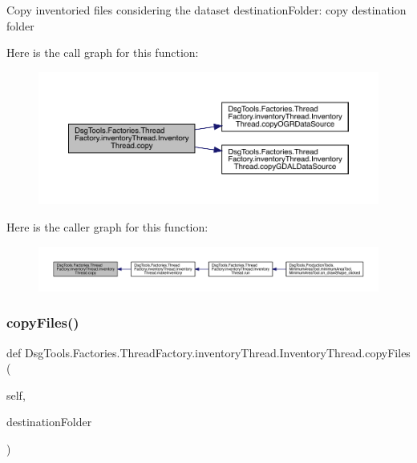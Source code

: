 \begin{DoxyVerb}Copy inventoried files considering the dataset
destinationFolder: copy destination folder
\end{DoxyVerb}
 Here is the call graph for this function\+:
\nopagebreak
\begin{figure}[H]
\begin{center}
\leavevmode
\includegraphics[width=350pt]{class_dsg_tools_1_1_factories_1_1_thread_factory_1_1inventory_thread_1_1_inventory_thread_a1dd2d109fee4f8015236e57b54caea5a_cgraph}
\end{center}
\end{figure}
Here is the caller graph for this function\+:
\nopagebreak
\begin{figure}[H]
\begin{center}
\leavevmode
\includegraphics[width=350pt]{class_dsg_tools_1_1_factories_1_1_thread_factory_1_1inventory_thread_1_1_inventory_thread_a1dd2d109fee4f8015236e57b54caea5a_icgraph}
\end{center}
\end{figure}
\mbox{\label{class_dsg_tools_1_1_factories_1_1_thread_factory_1_1inventory_thread_1_1_inventory_thread_a3c6dd527c4ca93af4a542d505ebe99f6}} 
\subsubsection{\texorpdfstring{copy\+Files()}{copyFiles()}}
{\footnotesize\ttfamily def Dsg\+Tools.\+Factories.\+Thread\+Factory.\+inventory\+Thread.\+Inventory\+Thread.\+copy\+Files (\begin{DoxyParamCaption}\item[{}]{self,  }\item[{}]{destination\+Folder }\end{DoxyParamCaption})}

